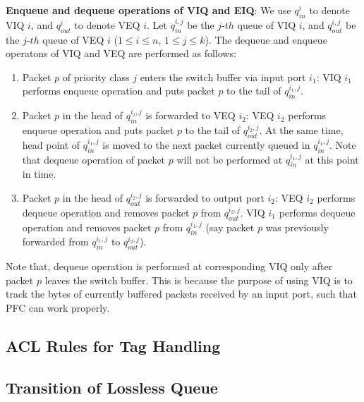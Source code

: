 \textbf{Enqueue and dequeue operations of VIQ and EIQ}: We use $q_{in}^{i}$ to denote VIQ $i$, and $q_{out}^{i}$ to denote VEQ $i$.
Let $q_{in}^{i,j}$ be the $j$-$th$ queue of VIQ $i$, and $q_{out}^{i,j}$ be the $j$-$th$ queue of VEQ $i$ ($1\leq i \leq n$, $1 \leq j \leq k$). The dequeue and enqueue operatons of VIQ and VEQ are performed as follows:
	
	\begin{enumerate}
		\item  Packet $p$ of priority class $j$ enters the switch buffer via input port $i_1$: VIQ $i_1$ performs enqueue operation and puts packet $p$ to the tail of $q_{in}^{i_1,j}$.
		
		\item  Packet $p$ in the head of $q_{in}^{i_1,j}$ is forwarded to VEQ $i_2$:  VEQ $i_2$ performs enqueue operation and puts packet $p$ to the tail of $q_{out}^{i_2,j}$. At the same time, head point of $q_{in}^{i_1,j}$ is moved to the next packet currently queued in $q_{in}^{i_1,j}$. Note that dequeue operation of packet $p$ will not be performed at $q_{in}^{i_1,j}$ at this point in time. 
		
		\item  Packet $p$ in the head of $q_{out}^{i_2,j}$ is forwarded to output port $i_2$: VEQ $i_2$ performs dequeue operation and removes packet $p$ from $q_{out}^{i_2,j}$.  VIQ $i_1$ performs dequeue operation and removes packet $p$ from $q_{in}^{i_1,j}$ (say packet $p$ was previously forwarded from $q_{in}^{i_1,j}$ to $q_{out}^{i_2,j}$). 
	\end{enumerate}
		
	Note that, dequeue operation is performed at corresponding VIQ only after packet $p$ leaves the switch buffer. This is because the purpose of using VIQ is to track the bytes of currently buffered packets received by an input port, such that PFC can work properly.

\subsection{ACL Rules for Tag Handling}\label{subsec:acl}


\subsection{Transition of Lossless Queue}\label{subsec:change_priority}



